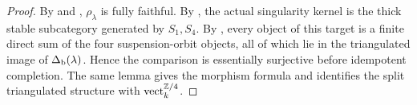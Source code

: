 \begin{proof}
By  and
, \(\rho_\lambda\) is fully faithful.  By
, the actual singularity kernel is the thick stable subcategory generated by \(S_1,S_4\).  By
, every object of this target is a finite direct sum of the four suspension-orbit objects, all of which lie in the triangulated image of \(\Delta_{\mathrm b}(\lambda)\).  Hence the comparison is essentially surjective before idempotent completion.  The same lemma gives the morphism formula and identifies the split triangulated structure with \(\operatorname{vect}_k^{\mathbb Z/4}\).
\end{proof}

